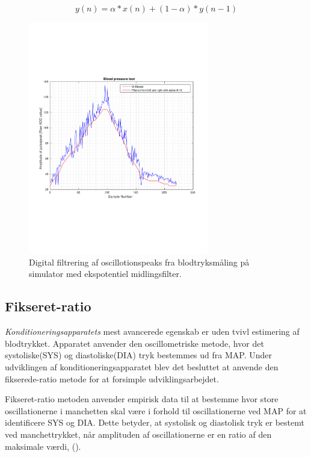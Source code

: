 \begin{equation}
y(n)=\alpha*x(n)+(1-\alpha)*y(n-1)
\label{eq:ekspotentielmidlingsfilter}
\end{equation}
\begin{figure}[H]
	\centering
	\includegraphics[trim={0 0 0 0},clip, width=0.7\textwidth]{billeder/digitalFilterData.pdf}	
	\parbox{10.5cm}{\caption{Digital filtrering af oscillotionspeaks fra blodtryksmåling på simulator med ekspotentiel midlingsfilter.}\label{fig:digitalFilterData}}
\end{figure}


\subsection{Fikseret-ratio} \label{Fikseret-ratio}
\textit{Konditioneringsapparatets} mest avancerede egenskab er uden tvivl estimering af blodtrykket. Apparatet anvender den oscillometriske metode, hvor det systoliske(SYS) og diastoliske(DIA) tryk  bestemmes ud fra MAP. Under udviklingen af konditioneringsapparatet blev det besluttet at anvende den fikserede-ratio metode for at forsimple udviklingsarbejdet.

Fikseret-ratio metoden anvender empirisk data til at bestemme hvor store oscillationerne i manchetten skal være i forhold til oscillationerne ved MAP for at identificere SYS og DIA. Dette betyder, at systolisk og diastolisk tryk er bestemt ved manchettrykket, når amplituden af oscillationerne er en ratio af den maksimale værdi, (\cite{drzewiecki1994theory}).

